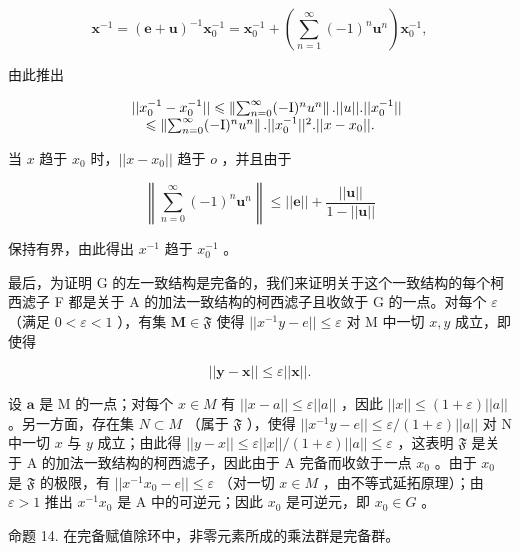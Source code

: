 \[
\boldsymbol {x} ^ {- 1} = (\boldsymbol {e} + \boldsymbol {u}) ^ {- 1} \boldsymbol {x} _ {0} ^ {- 1} = \boldsymbol {x} _ {0} ^ {- 1} + \left(\sum_ {n = 1} ^ {\infty} (- 1) ^ {n} \boldsymbol {u} ^ {n}\right) \boldsymbol {x} _ {0} ^ {- 1},\tag{9}
\]

由此推出

\[
\begin{array}{r l} & {| | x _ {0} ^ {- 1} - x _ {0} ^ {- 1} | | \leqslant \left\| \sum_ {n = 0} ^ {\infty} (- \mathrm{I}) ^ {n} u ^ {n} \right\|. | | u | |. | | x _ {0} ^ {- 1} | |} \\ & {\quad \leqslant \left\| \sum_ {n = 0} ^ {\infty} (- \mathrm{I}) ^ {n} u ^ {n} \right\|. | | x _ {0} ^ {- 1} | | ^ {2}. | | x - x _ {0} | |.} \end{array}
\]

当 \(x\) 趋于 \(x_0\) 时，\(||x - x_0||\) 趋于 \(o\) ，并且由于

\[
\left\| \sum_ {n = 0} ^ {\infty} (- 1) ^ {n} \boldsymbol {u} ^ {n} \right\| \leqslant | | \boldsymbol {e} | | + \frac {| | \boldsymbol {u} | |}{1 - | | \boldsymbol {u} | |}
\]

保持有界，由此得出 \(x^{-1}\) 趋于 \(x_{0}^{-1}\) 。

最后，为证明 G 的左一致结构是完备的，我们来证明关于这个一致结构的每个柯西滤子 F 都是关于 A 的加法一致结构的柯西滤子且收敛于 G 的一点。对每个 \(\varepsilon\) （满足 \(0 < \varepsilon < 1\) ），有集 \(\mathbf{M} \in \mathfrak{F}\) 使得 \(||x^{-1}y - e|| \leqslant \varepsilon\) 对 M 中一切 \(x, y\) 成立，即使得

\[
\left| \left| \mathbf {y} - \mathbf {x} \right| \right| \leqslant \varepsilon \left| \left| \mathbf {x} \right| \right|.
\]

设 \(\pmb{a}\) 是 M 的一点；对每个 \(x \in M\) 有 \(||x - a|| \leqslant \varepsilon ||a||\) ，因此 \(||x|| \leqslant (1 + \varepsilon)||a||\) 。另一方面，存在集 \(N \subset M\) （属于 \(\mathfrak{F}\) ），使得 \(||x^{-1}y - e|| \leqslant \varepsilon / (1 + \varepsilon)||a||\) 对 N 中一切 \(x\) 与 \(y\) 成立；由此得 \(||y - x|| \leqslant \varepsilon ||x|| / (1 + \varepsilon)||a|| \leqslant \varepsilon\) ，这表明 \(\mathfrak{F}\) 是关于 A 的加法一致结构的柯西滤子，因此由于 A 完备而收敛于一点 \(x_0\) 。由于 \(x_0\) 是 \(\mathfrak{F}\) 的极限，有 \(||x^{-1}x_0 - e|| \leqslant \varepsilon\) （对一切 \(x \in M\) ，由不等式延拓原理）；由 \(\varepsilon > 1\) 推出 \(x^{-1}x_0\) 是 A 中的可逆元；因此 \(x_0\) 是可逆元，即 \(x_0 \in G\) 。

命题 14. 在完备赋值除环中，非零元素所成的乘法群是完备群。

